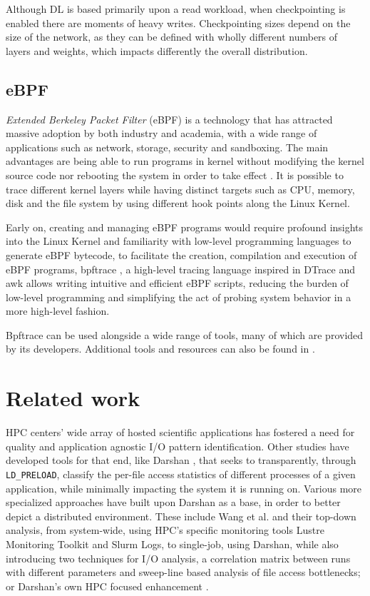 \documentclass[conference]{IEEEtran}
\begin{document}
Although DL is based primarily upon a read workload, when checkpointing is enabled there are moments of heavy writes. Checkpointing sizes depend on the size of the network, as they can be defined with wholly different numbers of layers and weights, which impacts differently the overall distribution.

\subsection{eBPF}

\textit{Extended Berkeley Packet Filter} (eBPF) is a technology that has attracted massive adoption by both industry and academia, with a wide range of applications such as network, storage, security and sandboxing.
The main advantages are being able to run programs in kernel without modifying the kernel source code nor rebooting the system in order to take effect \cite{eBPFSurvey}.
It is possible to trace different kernel layers while having distinct targets such as CPU, memory, disk and the file system by using different hook points along the Linux Kernel.

Early on, creating and managing eBPF programs would require profound insights into the Linux Kernel and familiarity with low-level programming languages to generate eBPF bytecode,
to facilitate the creation, compilation and execution of eBPF programs, bpftrace \cite{bpftrace}, a high-level tracing language inspired in DTrace and awk allows writing intuitive and efficient eBPF scripts,
reducing the burden of low-level programming and simplifying the act of probing system behavior in a more high-level fashion. \cite{eBPFSurvey2} 

Bpftrace can be used alongside a wide range of tools, many of which are provided by its developers. Additional tools and resources can also be found in \cite{bgreggBook}.

\section{Related work}


HPC centers' wide array of hosted scientific applications has fostered a need for quality and application agnostic I/O pattern identification. Other studies have developed tools for that end, like Darshan \cite{HPCIO24/7}, that seeks to transparently, through \texttt{LD\_PRELOAD}, classify the per-file access statistics of different processes of a given application, while minimally impacting the system it is running on. Various more specialized approaches have built upon Darshan as a base, in order to better depict a distributed environment. These include Wang et al. \cite{zoomin} and their top-down analysis, from system-wide, using HPC's specific monitoring tools Lustre Monitoring Toolkit and Slurm Logs, to single-job, using Darshan, while also introducing two techniques for I/O analysis, a correlation matrix between runs with different parameters and sweep-line based analysis of file access bottlenecks; or Darshan's own HPC focused enhancement \cite{HPCIODarshan}.
\end{document}
